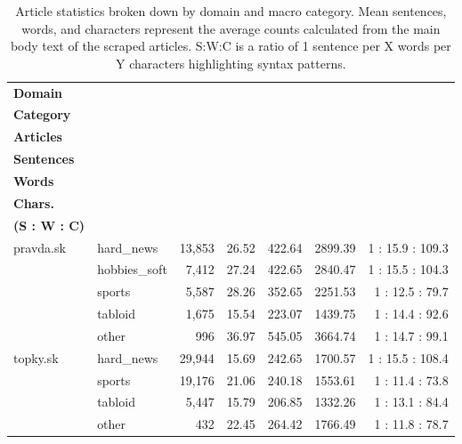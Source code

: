\documentclass[11pt,a4paper]{article}
\begin{document}
\begin{table}[H]
	\centering
	\small
	\begin{tabular}{@{}llrrrrr@{}}
		\toprule
		\textbf{Domain} & \makecell{\textbf{Macro}                                                                  \\ \textbf{Category}} & \makecell{\textbf{Total} \\ \textbf{Articles}} & \makecell{\textbf{Mean} \\ \textbf{Sentences}} & \makecell{\textbf{Mean} \\ \textbf{Words}} & \makecell{\textbf{Mean} \\ \textbf{Chars.}} & \makecell{\textbf{Ratio} \\ \textbf{(S : W : C)}} \\ \midrule
		pravda.sk
		                & hard\_news               & 13,853 & 26.52 & 422.64 & 2899.39 & 1 : 15.9 : 109.3           \\
		                & hobbies\_soft            & 7,412  & 27.24 & 422.65 & 2840.47 & 1 : 15.5 : 104.3           \\
		                & sports                   & 5,587  & 28.26 & 352.65 & 2251.53 & 1 : 12.5 : \phantom{0}79.7 \\
		                & tabloid                  & 1,675  & 15.54 & 223.07 & 1439.75 & 1 : 14.4 : \phantom{0}92.6 \\
		                & other                    & 996    & 36.97 & 545.05 & 3664.74 & 1 : 14.7 : \phantom{0}99.1 \\ \midrule
		topky.sk
		                & hard\_news               & 29,944 & 15.69 & 242.65 & 1700.57 & 1 : 15.5 : 108.4           \\
		                & sports                   & 19,176 & 21.06 & 240.18 & 1553.61 & 1 : 11.4 : \phantom{0}73.8 \\
		                & tabloid                  & 5,447  & 15.79 & 206.85 & 1332.26 & 1 : 13.1 : \phantom{0}84.4 \\
		                & other                    & 432    & 22.45 & 264.42 & 1766.49 & 1 : 11.8 : \phantom{0}78.7 \\ \bottomrule
	\end{tabular}
	\caption{Article statistics broken down by domain and macro category. Mean sentences, words, and characters represent the average counts calculated from the main body text of the scraped articles. S:W:C is a ratio of 1 sentence per X words per Y characters highlighting syntax patterns.}
	\label{tab:article_cat_stats}
\end{table}
\end{document}
